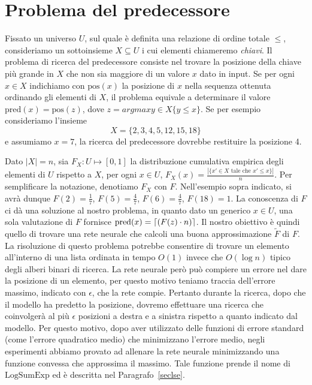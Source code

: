 \documentclass[11pt,a4paper,twoside,
openright]{book}
\DeclarePairedDelimiter{\ceil}{\lceil}{\rceil}
\begin{document}
\section{Problema del predecessore}
Fissato un universo $U$, sul quale è definita una relazione di ordine totale $\leq$, consideriamo un sottoinsieme $X \subseteq U$ i cui elementi chiameremo \emph{chiavi}. Il problema di ricerca del predecessore consiste nel trovare la posizione della chiave più grande in $X$ che non sia maggiore di un valore $x$ dato in input. Se per ogni $x \in X$ indichiamo con $\mathrm{pos}(x)$ la posizione di $x$ nella sequenza ottenuta ordinando gli elementi di $X$, il problema equivale a determinare il valore $\mathrm{pred}(x) = \mathrm{pos}(z)$, dove $z = arg max{y \in X} \{ y \leq x\}$.
Se per esempio consideriamo l'insieme $$\displaystyle{ X=\{2,3,4,5,12,15,18\}}$$ e assumiamo $x=7$, la ricerca del predecessore dovrebbe restituire la posizione 4.

Dato $|X|=n$, sia $F_X: U \mapsto [0, 1]$ la distribuzione cumulativa empirica degli elementi di $U$ rispetto a $X$, per ogni $x\in U$, $F_X(x) = \frac{| \{x' \in X \text{ tale che }x' \leq x\} |}{n}$. Per semplificare la notazione, denotiamo $F_{X}$ con $F$. Nell'esempio sopra indicato, si avrà dunque $F(2)=\frac{1}{7}$, $F(5)=\frac{4}{7}$, $F(6)=\frac{4}{7}$, $F(18)=1$. La conoscenza di $F$ ci dà una soluzione al nostro problema, in quanto dato un generico $x \in U$, una sola valutazione di $F$ fornisce $\mathrm{pred}(x) = \ceil{(F(z)\cdot n)}$. Il nostro obiettivo è quindi quello di trovare una rete neurale che calcoli una buona approssimazione $\tilde{F}$ di $F$.
La risoluzione di questo problema potrebbe consentire di trovare un elemento all'interno di una lista ordinata in tempo $O(1)$ invece che $O(\log n)$ tipico degli alberi binari di ricerca.
La rete neurale però può compiere un errore nel dare la posizione di un elemento, per questo motivo teniamo traccia dell'errore massimo, indicato con $\epsilon$, che la rete compie. Pertanto durante la ricerca, dopo che il modello ha predetto la posizione, dovremo effettuare una ricerca che coinvolgerà al più $\epsilon$ posizioni a destra e a sinistra rispetto a quanto indicato dal modello. Per questo motivo, dopo aver utilizzato delle funzioni di errore standard (come l'errore quadratico medio) che minimizzano l'errore medio, negli esperimenti abbiamo provato ad allenare la rete neurale minimizzando una funzione convessa che approssima il massimo. Tale funzione prende il nome di $\mathrm{LogSumExp}$ ed è descritta nel Paragrafo~\ref{seclse}.
\end{document}

